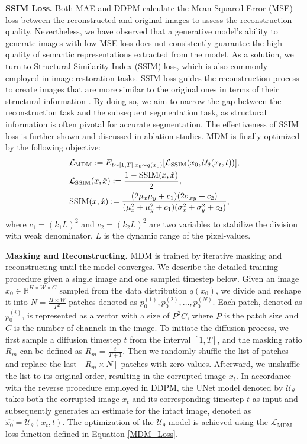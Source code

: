 \documentclass{article} \usepackage{iclr2024_conference,times}
\begin{document}
\textbf{SSIM Loss.} Both MAE and DDPM calculate the Mean Squared Error (MSE) loss between the reconstructed and original images to assess the reconstruction quality. Nevertheless, we have observed that a generative model's ability to generate images with low MSE loss does not consistently guarantee the high-quality of semantic representations extracted from the model.
As a solution, we turn to Structural Similarity Index (SSIM) loss, which is also commonly employed in image restoration tasks. SSIM loss guides the reconstruction process to create images that are more similar to the original ones in terms of their structural information \citep{DBLP:journals/tip/WangBSS04}. By doing so, we aim to narrow the gap between the reconstruction task and the subsequent segmentation task, as structural information is often pivotal for accurate segmentation. The effectiveness of SSIM loss is further shown and discussed in ablation studies. MDM is finally optimized by the following objective:
\begin{align}
    &\mathcal{L}_{\textrm{MDM}} := E_{t \sim [1, T], x_0 \sim q(x_0)}[\mathcal{L}_{\textrm{SSIM}}(x_0, \mathcal{U}_{\theta}(x_t, t))], \label{MDM_Loss} \\ 
   &\mathcal{L}_{\textrm{SSIM}}(x, \hat{x}) := \frac{1 - \textrm{SSIM}(x, \hat{x})}{2},\notag\\
    &\textrm{SSIM}(x, \hat{x}) := \frac{(2\mu_x\mu_y+c_1)(2\sigma_{xy}+c_2)}{(\mu_{x}^{2} + \mu_{y}^{2} + c_1)(\sigma_{x}^{2} + \sigma_{y}^{2} + c_2)} \notag,
\end{align}
where $c_1=(k_1L)^2$ and $c_2=(k_2L)^2$ are two variables to stabilize the division with weak denominator, $L$ is the dynamic range of the pixel-values.

\textbf{Masking and Reconstructing.}
MDM is trained by iterative masking and reconstructing until the model converges. We describe the detailed training procedure given a single image and one sampled timestep below.
Given an image \(x_0 \in \mathbb{R}^{H \times W \times C}\) sampled from the data distribution \(q(x_0)\), we divide and reshape it into \(N = \frac{H \times W}{P^2}\) patches denoted as \(p_0^{(1)}, p_0^{(2)}, \ldots, p_0^{(N)}\). Each patch, denoted as \(p_{0}^{(i)}\), is represented as a vector with a size of \(P^2C\), where \(P\) is the patch size and \(C\) is the number of channels in the image. To initiate the diffusion process, we first sample a diffusion timestep \(t\) from the interval $ [1, T] $, and the masking ratio $R_m$ can be defined as $R_m = \frac{t}{T+1}$. Then we randomly shuffle the list of patches and replace the last $\left\lfloor R_m \times N \right\rfloor$ patches with zero values. Afterward, we unshuffle the list to its original order, resulting in the corrupted image \(x_t\). In accordance with the reverse procedure employed in DDPM, the UNet model denoted by \(\mathcal{U}_\theta\) takes both the corrupted image \(x_t\) and its corresponding timestep \(t\) as input and subsequently generates an estimate for the intact image, denoted as \(\hat{x_0} = \mathcal{U}_\theta(x_t, t)\). The optimization of the \(\mathcal{U}_\theta\) model is achieved using the \(\mathcal{L}_{\textrm{MDM}}\) loss function defined in Equation \ref{MDM_Loss}. 
\end{document}
